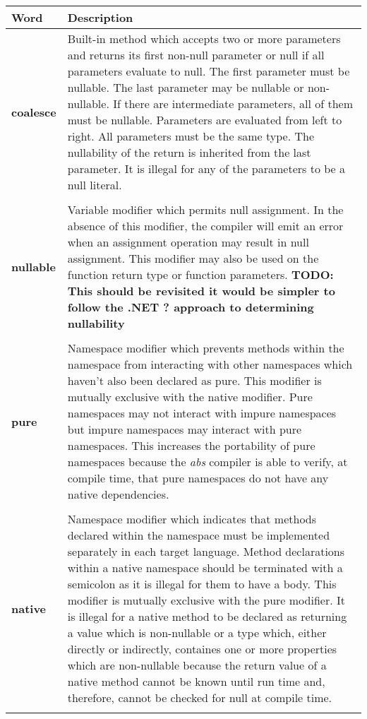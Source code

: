 \documentclass[hidelinks]{article}
\begin{document}
\begin{longtable}{ |p{4cm}|p{11cm}|  }
\hline
\textbf{Word} & \textbf{Description} \\
\hline
\textbf{coalesce} & Built-in method which accepts two or more parameters and returns its first non-null parameter or null if all parameters evaluate to null. The first parameter must be nullable. The last parameter may be nullable or non-nullable. If there are intermediate parameters, all of them must be nullable. Parameters are evaluated from left to right. All parameters must be the same type. The nullability of the return is inherited from the last parameter. It is illegal for any of the parameters to be a null literal.\\
&\\
\textbf{nullable} & Variable modifier which permits null assignment. In the absence of this modifier, the compiler will emit an error when an assignment operation may result in null assignment. This modifier may also be used on the function return type or function parameters. \textbf{TODO: This should be revisited it would be simpler to follow the .NET ? approach to determining nullability} \\
&\\
\textbf{pure} & Namespace modifier which prevents methods within the namespace from interacting with other namespaces which haven't also been declared as pure. This modifier is mutually exclusive with the native modifier. Pure namespaces may not interact with impure namespaces but impure namespaces may interact with pure namespaces. This increases the portability of pure namespaces because the \textit{abs} compiler is able to verify, at compile time, that pure namespaces do not have any native dependencies.\\
&\\
\textbf{native} & Namespace modifier which indicates that methods declared within the namespace must be implemented separately in each target language. Method declarations within a native namespace should be terminated with a semicolon as it is illegal for them to have a body. This modifier is mutually exclusive with the pure modifier. It is illegal for a native method to be declared as returning a value which is non-nullable or a type which, either directly or indirectly, containes one or more properties which are non-nullable because the return value of a native method cannot be known until run time and, therefore, cannot be checked for null at compile time.\\
&\\

\end{longtable}
\end{document}
